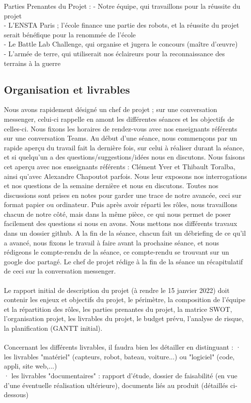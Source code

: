 \documentclass[11pt]{article}
\begin{document}
Parties Prenantes du Projet :
-    Notre équipe, qui travaillons pour la réussite du projet \\
-    L’ENSTA Paris ; l’école finance une partie des robots, et la réussite du projet serait bénéfique pour la renommée de l’école \\
-    Le Battle Lab Challenge, qui organise et jugera le concours (maître d’œuvre) \\
-    L’armée de terre, qui utiliserait nos éclaireurs pour la reconnaissance des terrains à la guerre \\

\subsection{Organisation et livrables}

Nous avons rapidement désigné un chef de projet ; sur une conversation messenger, celui-ci rappelle en amont les différentes séances et les objectifs de celles-ci. Nous fixons les horaires de rendez-vous avec nos enseignants référents sur une conversation Teams.
Au début d’une séance, nous commençons par un rapide aperçu du travail fait la dernière fois, sur celui à réaliser durant la séance, et si quelqu’un a des questions/suggestions/idées nous en discutons. Nous faisons cet aperçu avec nos enseignants référents : Clément Yver et Thibault Toralba, ainsi qu’avec Alexandre Chapoutot parfois. Nous leur exposons nos interrogations et nos questions de la semaine dernière et nous en discutons. Toutes nos discussions sont prises en notes pour garder une trace de notre avancée, ceci sur format papier ou ordinateur.
Puis après avoir réparti les rôles, nous travaillons chacun de notre côté, mais dans la même pièce, ce qui nous permet de poser facilement des questions si nous en avons. Nous mettons nos différents travaux dans un dossier github.
A la fin de la séance, chacun fait un débriefing de ce qu’il a avancé, nous fixons le travail à faire avant la prochaine séance, et nous rédigeons le compte-rendu de la séance, ce compte-rendu se trouvant sur un google doc partagé.
Le chef de projet rédige à la fin de la séance un récapitulatif de ceci sur la conversation messenger. \\
\\

Le rapport initial de description du projet (à rendre le 15 janvier 2022) doit contenir les enjeux et objectifs du projet, le périmètre, la composition de l'équipe et la répartition des rôles, les parties prenantes du projet, la matrice SWOT, l'organisation projet, les livrables du projet, le budget prévu, l'analyse de risque, la planification (GANTT initial).\\
\\
Concernant les différents livrables, il faudra bien les détailler en distinguant :
· les livrables "matériel" (capteurs, robot, bateau, voiture...) ou "logiciel" (code, appli, site web,...) \\
· les livrables "documentaires" : rapport d'étude, dossier de faisabilité (en vue d'une éventuelle réalisation ultérieure), documents liés au produit (détaillés ci-dessous) \\
\end{document}
